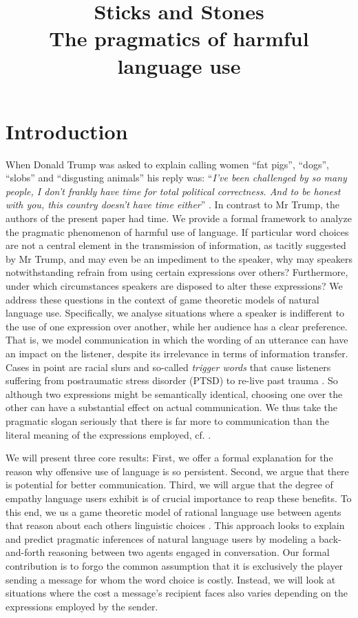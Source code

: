 \documentclass[10pt,a4paper]{article}
\title{%
  Sticks and Stones \\
  \large The pragmatics of harmful language use}
\begin{document}
\maketitle

\section{Introduction}
When Donald Trump was asked to explain calling women ``fat pigs'', ``dogs'', ``slobs'' and ``disgusting animals'' his reply was: ``\textit{I’ve been challenged by so many people, I don’t frankly have time for total political correctness. And to be honest with you, this country doesn’t have time either}'' \cite{weigel2016}. In contrast to Mr Trump, the authors of the present paper had time. We provide a formal framework to analyze the pragmatic phenomenon of harmful use of language. If particular word choices are not a central element in the transmission of information, as tacitly suggested by Mr Trump, and may even be an impediment to the speaker, why may speakers notwithstanding refrain from using certain expressions over others? Furthermore, under which circumstances speakers are disposed to alter these expressions? We address these questions in the context of game theoretic models of natural language use. Specifically, we analyse situations where a speaker is indifferent to the use of one expression over another, while her audience has a clear preference. That is, we model communication in which the wording of an utterance can have an impact on the listener, despite its irrelevance in terms of information transfer. Cases in point are racial slurs and so-called \textit{trigger words} that cause listeners suffering from postraumatic stress disorder (PTSD) to re-live past trauma \cite{fagan2004confronting, yehuda2002post}. So although two expressions might be semantically identical, choosing one over the other can have a substantial effect on actual communication. We thus take the pragmatic slogan seriously that there is far more to communication than the literal meaning of the expressions employed, cf. \cite{grice1975logic}. %

We will present three core results: First, we offer a formal explanation for the reason why offensive use of language is so persistent. Second, we argue that there is potential for better communication. Third, we will argue that the degree of empathy language users exhibit is of crucial importance to reap these benefits. To this end, we us a game theoretic model of rational language use between agents that reason about each others linguistic choices \cite{franke2014pragmatic}. This approach looks to explain and predict pragmatic inferences of natural language users by modeling a back-and-forth reasoning between two agents engaged in conversation.
Our formal contribution is to forgo the common assumption that it is exclusively the player sending a message for whom the word choice is costly. Instead, we will look at situations where the cost a message's recipient faces also varies depending on the expressions employed by the sender.
\end{document}
